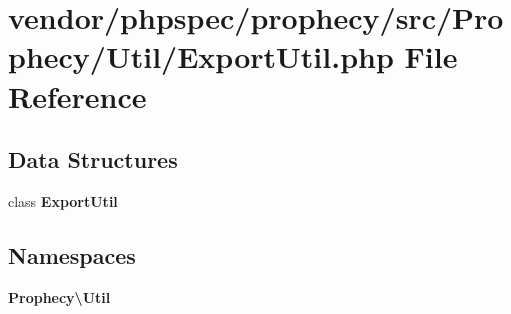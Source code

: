 \section{vendor/phpspec/prophecy/src/\+Prophecy/\+Util/\+Export\+Util.php File Reference}
\label{_export_util_8php}
\subsection*{Data Structures}
\begin{DoxyCompactItemize}
\item 
class {\bf Export\+Util}
\end{DoxyCompactItemize}
\subsection*{Namespaces}
\begin{DoxyCompactItemize}
\item 
 {\bf Prophecy\textbackslash{}\+Util}
\end{DoxyCompactItemize}

